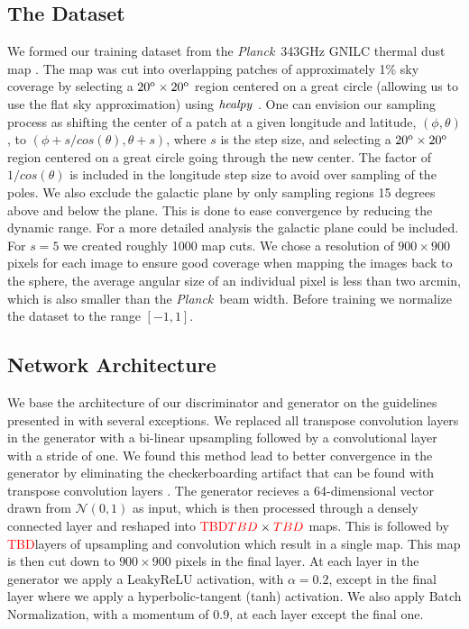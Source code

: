 \documentclass[twocolumn]{aastex62}
\def\tbd{\textcolor{red}{TBD}}
\newcommand{\planck}{\textit{Planck}}
\begin{document}
\subsection{The Dataset}
We formed our training dataset from the \planck\ 343GHz GNILC thermal dust map \citep{planck16-48}. The map was cut into overlapping patches of approximately 1\% sky coverage by selecting a $20^{\rm{o}} \times 20^{\rm{o}}$ region centered on a great circle (allowing us to use the flat sky approximation) using $\it{healpy}$ \citep{gorski05}.  One can envision our sampling process as shifting the center of a patch at a given longitude and latitude, $(\phi,\theta)$, to  $(\phi+s/cos(\theta),\theta+s)$, where $s$ is the step size,  and selecting a $20^{\rm{o}} \times 20^{\rm{o}}$ region centered on a great circle going through the new center. The factor of $1/cos(\theta)$ is included in the longitude step size to avoid over sampling of the poles. We also exclude the galactic plane by only sampling regions 15 degrees above and below the plane. This is done to ease convergence by reducing the dynamic range. For a more detailed analysis the galactic plane could be included. For $s=5$ we created roughly 1000 map cuts.  We chose a resolution of $900\times900$ pixels for each image to ensure good coverage when mapping the images back to the sphere, the average angular size of an individual pixel is less than two arcmin, which is also smaller than the \planck\ beam width. Before training we normalize the dataset to the range $[-1,1]$.

\subsection{Network Architecture}
We base the architecture of our discriminator and generator on the guidelines presented in \cite{radford15} with several exceptions.
We replaced all transpose convolution layers in the generator with a bi-linear upsampling followed by a convolutional layer with a stride of one.
We found this method lead to better convergence in the generator by eliminating the checkerboarding artifact that can be found with transpose convolution layers \citep{odena16}.
The generator recieves a 64-dimensional vector drawn from $\mathcal{N}(0,1)$ as input, which is then processed through a densely connected layer and reshaped into \tbd $\tbd \times \tbd$ maps.
This is followed by \tbd layers of upsampling and convolution which result in a single map.
This map is then cut down to $900\times900$ pixels in the final layer. 
At each layer in the generator we apply a LeakyReLU activation, with $\alpha = 0.2$, except in the final layer where we apply a hyperbolic-tangent (tanh) activation.
We also apply Batch Normalization, with a momentum of 0.9, at each layer except the final one.
\end{document}
